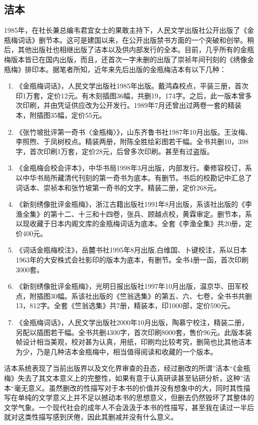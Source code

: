 \subsection{洁本}

1985年，在社长兼总编韦君宜女士的果敢主持下，人民文学出版社公开出版了《金瓶梅词话》删节本。这可是建国以来，在公开出版禁书方面的一个突破和创举。稍后，其他出版社也相继出版了洁本以及供内部发行的全本。目前，几乎所有的金瓶梅版本皆已在国内出版，而且，还首次一字未删的出版了崇祯年间刊刻的《绣像金瓶梅》排印本。据笔者所知，近年来先后出版的金瓶梅洁本有以下几种：
\begin{enumerate}
\item 《金瓶梅词话》，人民文学出版社1985年出版。戴鸿森校点，平装三册，首次印1万套，定价12元。有木刻插图36幅，共删19，174字。之后，此一版本曾多次印刷，并由凭证供应改为公开发行。1989年7月还曾出过两卷一套的精装本，附插图35幅，定价55元。
\item 《张竹坡批评第一奇书〈金瓶梅〉》，山东齐鲁书社1987年10月出版。王汝梅、李照煦、于凤树校点。精装两册，附陈全胜绘彩图若干幅。全书共删10，398字，首次印刷1万套，定价28元，后曾多次印刷。甚至有过盗版。
\item 《金瓶梅会校会评本》，中华书局1998年3月出版，内部发行。秦修容校订，系以中华书局所藏清代刊刻的第一奇书为底本。有删节。书后的校勘记中汇总了词话本、崇祯本和张竹坡第一奇书的文字。精装二册，定价268元。
\item 《新刻绣像批评金瓶梅》，浙江古籍出版社1991年8月出版，系该社出版的《李渔全集》的第十二、十三和十四卷，张兵、顾越点校，黄霖审定。删节本，系以现收藏于日本内阁文库的金瓶梅词话为底本。全套《李渔全集》共20册，定价400元。
\item 《词话金瓶梅校注》，岳麓书社1995年8月出版,白维国、卜键校注，系以日本1963年的大安株式会社影印的版本为底本，有删节。全书4册一函，首次印刷3000套。
\item 《新刻绣像批评金瓶梅》，光明日报出版社1997年10月出版，温京华、田军校点，附插图30幅。系该社出版的《竺翁选集》的第五、六、七卷，全书书共删13，812字。全套《竺翁选集》共7册，精装本，印1000部，定价590元。
\item 《金瓶梅词话》，人民文学出版社2000年10月出版，陶慕宁校注，精装二册，另配以插图若干幅。全书共删4300字，首次印刷8000套，售价96元。此版本装帧设计相当美观，校对甚为认真，用纸，印刷均比较考究，删简也比其他洁本为少，乃是几种洁本金瓶梅中，相当值得阅读和收藏的一个版本。
\end{enumerate}

洁本系统表现了当前出版界以及文化界审查的丑态，经过删改的所谓”洁本“《金瓶梅》失去了其文本意义上的完整性，如果有意于认真研读甚至钻研分析，这种”洁本“毫无意义。虽然删改的性描写对于本书的价值并没有想象中的大，同时其性描写在单纯的文学意义上并不足以撼动本书的思想意义，但删去仍然毁坏了其整体的文学气象。一个现代社会的成年人不会汲汲于本书的性描写，甚至我在读过一半后就对这类性描写感到厌倦，因此其删减并没有什么意义。

